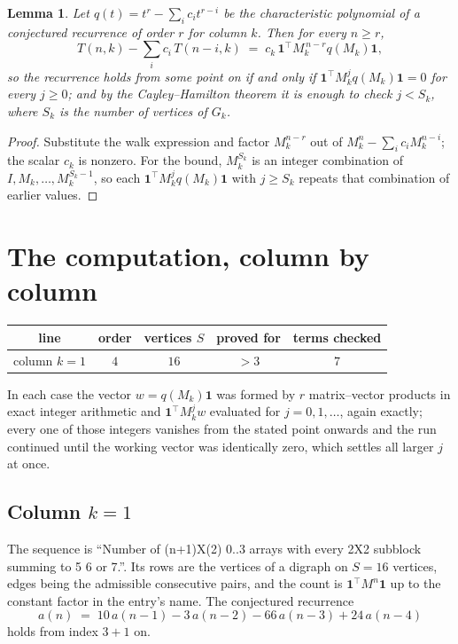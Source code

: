 \documentclass[11pt,a4paper]{article}
\theoremstyle{plain}
\newtheorem{lemma}[theorem]{Lemma}
\theoremstyle{definition}
\begin{document}
\begin{lemma}\label{lem:crit}
Let $q(t)=t^{r}-\sum_i c_it^{r-i}$ be the characteristic polynomial of a conjectured
recurrence of order $r$ for column $k$. Then for every $n\ge r$,
\[
T(n,k)-\sum_i c_i\,T(n-i,k)\;=\;c_k\,\mathbf{1}^{\!\top}M_k^{\,n-r}q(M_k)\mathbf{1},
\]
so the recurrence holds from some point on if and only if
$\mathbf{1}^{\!\top}M_k^{j}q(M_k)\mathbf{1}=0$ for every $j\ge0$; and by the
Cayley--Hamilton theorem it is enough to check $j<S_k$, where $S_k$ is the number of vertices
of $G_k$.
\end{lemma}

\begin{proof}
Substitute the walk expression and factor $M_k^{n-r}$ out of $M_k^{n}-\sum_ic_iM_k^{n-i}$;
the scalar $c_k$ is nonzero. For the bound, $M_k^{S_k}$ is an integer combination of
$I,M_k,\dots,M_k^{S_k-1}$, so each $\mathbf{1}^{\!\top}M_k^{j}q(M_k)\mathbf{1}$ with
$j\ge S_k$ repeats that combination of earlier values.
\end{proof}

\section{The computation, column by column}

\begin{center}
\begin{tabular}{ccccc}
line & order & vertices $S$ & proved for & terms checked \\ \hline
column $k$$=1$ & $4$ & $16$ & $>3$ & $7$ \\
\end{tabular}
\end{center}

In each case the vector $w=q(M_k)\mathbf{1}$ was formed by $r$ matrix--vector products in
exact integer arithmetic and $\mathbf{1}^{\!\top}M_k^{j}w$ evaluated for $j=0,1,\dots$,
again exactly; every one of those integers vanishes from the stated point onwards and the run
continued until the working vector was identically zero, which settles all larger $j$ at once.

\subsection*{Column $k$$=1$}
The sequence is ``Number of (n+1)X(2) 0..3 arrays with every 2X2 subblock summing to 5 6 or 7.''. Its rows are the vertices of a digraph on
$S=16$ vertices, edges being the admissible consecutive pairs, and the count is
$\mathbf{1}^{\!\top}M^{n}\mathbf{1}$ up to the constant factor in the entry's name.
The conjectured recurrence
\[
a(n)\;=\;10\,a(n-1) - 3\,a(n-2) - 66\,a(n-3) + 24\,a(n-4)
\]
holds from index $3+1$ on.
\end{document}
